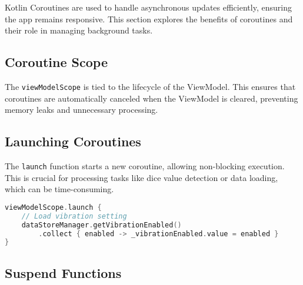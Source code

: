 Kotlin Coroutines are used to handle asynchronous updates efficiently, ensuring the app remains responsive. This section explores the benefits of coroutines and their role in managing background tasks.

\subsection{Coroutine Scope}

The \texttt{viewModelScope} is tied to the lifecycle of the ViewModel. This ensures that coroutines are automatically canceled when the ViewModel is cleared, preventing memory leaks and unnecessary processing.

\begin{figure}[ht!]
    \centering
\end{figure} 
\label{fig:lifecycle_viewmodelscope}

\subsection{Launching Coroutines}

The \texttt{launch} function starts a new coroutine, allowing non-blocking execution. This is crucial for processing tasks like dice value detection or data loading, which can be time-consuming.
\begin{lstlisting}[language=Kotlin, caption={Launching a Coroutine}, label=lst:launch_coroutine]
viewModelScope.launch {
    // Load vibration setting
    dataStoreManager.getVibrationEnabled()
        .collect { enabled -> _vibrationEnabled.value = enabled }
}
\end{lstlisting}
\label{lst:launch_coroutine}

\subsection{Suspend Functions}

